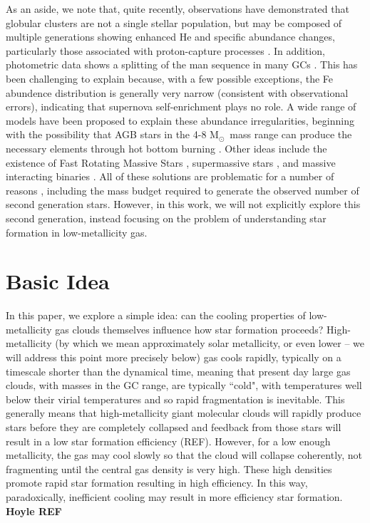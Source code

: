 \documentclass[useAMS,usenatbib]{mn2e}
\newcommand{\msun}{{M$_\odot$}}
\begin{document}
As an aside, we note that, quite recently, observations have demonstrated that globular clusters are not a single stellar population, but may be composed of multiple generations showing enhanced He and specific abundance changes, particularly those associated with proton-capture processes \citep[e.g.,][]{Norris1981, Kraft1994, Gratton2001, Carretta2009}.  In addition, photometric data shows a splitting of the man sequence in many GCs \citet[e.g.,][]{Piotto2009, Anderson2009, Milone2010}.  This has been challenging to explain because, with a few possible exceptions, the Fe abundence distribution is generally very narrow (consistent with observational errors), indicating that supernova self-enrichment plays no role.  A wide range of models have been proposed to explain these abundance irregularities, beginning with the possibility that AGB stars in the 4-8 \msun\ mass range can produce the necessary elements through hot bottom burning \citep[e.g.,][]{DErcole2010, Ventura2013}.  Other ideas include the existence of Fast Rotating Massive Stars \citep[FRMS][]{Krause2013}, supermassive stars \citep{Denissenkov2014,  Denissenkov2015}, and massive interacting binaries \citet[e.g.,][]{deMink2009, Bastian2013}.  All of these solutions are problematic for a number of reasons \citep[e.g.,][]{Renzini2015, Bastian2015}, including the mass budget required to generate the observed number of second generation stars.  However, in this work, we will not explicitly explore this second generation, instead focusing on the problem of understanding star formation in low-metallicity gas.


%
\section{Basic Idea}
\label{sec:basic}

In this paper, we explore a simple idea: can the cooling properties of low-metallicity gas clouds themselves influence how star formation proceeds?  High-metallicity (by which we mean approximately solar metallicity, or even lower -- we will address this point more precisely below) gas cools rapidly, typically on a timescale shorter than the dynamical time, meaning that present day large gas clouds, with masses in the GC range, are typically ``cold", with temperatures well below their virial temperatures and so rapid fragmentation is inevitable.  This generally means that high-metallicity giant molecular clouds will rapidly produce stars before they are completely collapsed and feedback from those stars will result in a low star formation efficiency (REF).  However, for a low enough metallicity, the gas may cool slowly so that the cloud will collapse coherently, not fragmenting until the central gas density is very high.  These high densities promote rapid star formation resulting in high efficiency.  In this way, paradoxically, inefficient cooling may result in more efficiency star formation.  {\bf Hoyle REF}
\end{document}

